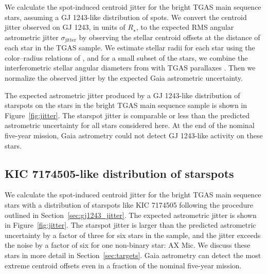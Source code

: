 We calculate the spot-induced centroid jitter for the bright TGAS main sequence stars, assuming a GJ 1243-like distribution of spots. We convert the centroid jitter observed on GJ 1243, in units of $R_\star$, to the expected RMS angular astrometric jitter $\sigma_{\mathrm{jitter}}$ by observing the stellar centroid offsets at the distance of each star in the TGAS sample. We estimate stellar radii for each star using the color--radius relations of \citet{boyajian2012}, and for a small subset of the stars, we combine the interferometric stellar angular diameters from \citet{boyajian2012} with TGAS parallaxes \citep{Michalik2015}. Then we normalize the observed jitter by the expected Gaia astrometric uncertainty. 

The expected astrometric jitter produced by a GJ 1243-like distribution of starspots on the stars in the bright TGAS main sequence sample is shown in Figure~\ref{fig:jitter}. The starspot jitter is comparable or less than the predicted astrometric uncertainty for all stars considered here. At the end of the nominal five-year mission, Gaia astrometry could not detect GJ 1243-like activity on these stars.

\subsection{KIC 7174505-like distribution of starspots} \label{sec:kic_jitter}


We calculate the spot-induced centroid jitter for the bright TGAS main sequence stars with a distribution of starspots like KIC 7174505 following the procedure outlined in Section~\ref{sec:gj1243_jitter}. The expected astrometric jitter is shown in Figure~\ref{fig:jitter}. The starspot jitter is larger than the predicted astrometric uncertainty by a factor of three for six stars in the sample, and the jitter exceeds the noise by a factor of six for one non-binary star: AX Mic. We discuss these stars in more detail in Section~\ref{sec:targets}. Gaia astrometry can detect the most extreme centroid offsets even in a fraction of the nominal five-year mission.

